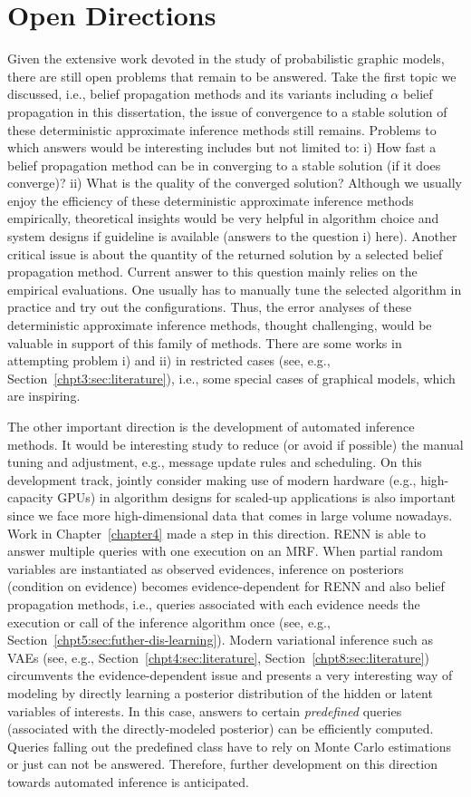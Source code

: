 \section{Open Directions}
Given the extensive work devoted in the study of probabilistic graphic models, there are still open problems that remain to be answered. Take the first topic we discussed, i.e., belief propagation methods and its variants including $\alpha$ belief propagation in this dissertation, the issue of convergence to a stable solution of these deterministic approximate inference methods still remains. Problems to which answers would be interesting includes but not limited to: i) How fast a belief propagation method can be in converging to a stable solution (if it does converge)? ii) What is the quality of the converged solution? Although we usually enjoy the efficiency of these deterministic approximate inference methods empirically, theoretical insights would be very helpful in algorithm choice and system designs if guideline is available (answers to the question i) here). Another critical issue is about the quantity of the returned solution by a selected belief propagation method. Current answer to this question mainly relies on the empirical evaluations. One usually has to manually tune the selected algorithm in practice and try out the configurations. Thus, the error analyses of these deterministic approximate inference methods, thought challenging, would be valuable in support of this family of methods. There are some works in attempting problem i) and ii) in restricted cases (see, e.g., Section~\ref{chpt3:sec:literature}), i.e., some special cases of graphical models, which are inspiring. 

The other important direction is the development of automated inference methods. It would be interesting study to reduce (or avoid if possible) the manual tuning and adjustment, e.g., message update rules and scheduling. On this development track, jointly consider making use of modern hardware (e.g., high-capacity GPUs) in algorithm designs for scaled-up applications is also important since we face more high-dimensional data that comes in large volume nowadays. Work in Chapter~\ref{chapter4} made a step in this direction. RENN is able to answer multiple queries with one execution on an MRF. When partial random variables are instantiated as observed evidences, inference on posteriors (condition on evidence) becomes evidence-dependent for RENN and also belief propagation methods, i.e., queries associated with each evidence needs the execution or call of the inference algorithm once (see, e.g., Section~\ref{chpt5:sec:futher-dis-learning}). Modern variational inference such as VAEs (see, e.g., Section~\ref{chpt4:sec:literature}, Section~\ref{chpt8:sec:literature}) circumvents the evidence-dependent issue and presents a very interesting way of modeling by directly learning a posterior distribution of the hidden or latent variables of interests. In this case, answers to certain \textit{predefined} queries (associated with the directly-modeled posterior) can be efficiently computed. Queries falling out the predefined class have to rely on Monte Carlo estimations or just can not be answered. Therefore, further development on this direction towards automated inference is anticipated.


